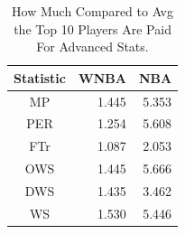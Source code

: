 \documentclass[12pt, titlepage]{article}
\begin{document}
\begin{table}[tbp]
    \caption{How Much Compared to Avg the Top 10 Players Are Paid For Advanced Stats.}
    \label{tab:top10}
\centering
\begin{tabular}{crr}
\toprule
Statistic &  WNBA  & NBA \\ 
\midrule
 MP  &  1.445  & 5.353 \\
 PER   &  1.254   & 5.608        \\       
 FTr   &  1.087   & 2.053       \\         
 OWS   & 1.445    & 5.666        \\
 DWS  & 1.435    & 3.462       \\
 WS   &  1.530  & 5.446        \\
 \bottomrule
\end{tabular}
\end{table}
\end{document}
